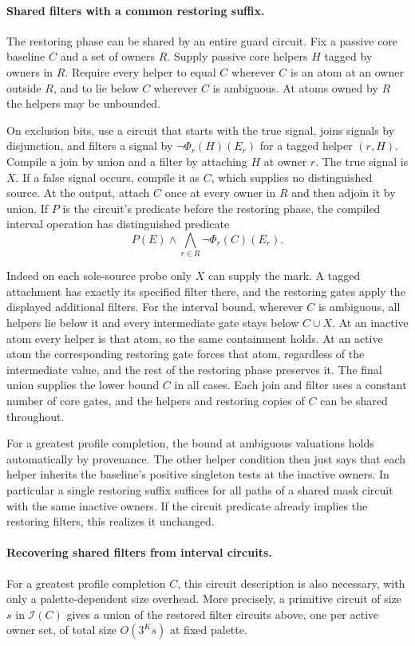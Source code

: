 \paragraph{Shared filters with a common restoring suffix.}
The restoring phase can be shared by an entire
guard circuit. Fix a passive core baseline $C$
and a set of owners $R$. Supply passive core
helpers $H$ tagged by owners in $R$. Require
every helper to equal $C$ wherever $C$ is an
atom at an owner outside $R$, and to lie below
$C$ wherever $C$ is ambiguous. At atoms owned
by $R$ the helpers may be unbounded.

On exclusion bits, use a circuit that starts
with the true signal, joins signals by
disjunction, and filters a signal by
$\neg\Phi_r(H)(E_r)$ for a tagged helper
$(r,H)$. Compile a join by union and a filter
by attaching $H$ at owner $r$. The true signal
is $X$. If a false signal occurs, compile it
as $C$, which supplies no distinguished source.
At the output, attach $C$ once at every owner
in $R$ and then adjoin it by union. If $P$ is
the circuit's predicate before the restoring
phase, the compiled interval operation has
distinguished predicate
\[
             P(E)\land\bigwedge_{r\in R}\neg\Phi_r(C)(E_r).
\]

Indeed on each sole-source probe only $X$
can supply the mark. A tagged attachment has
exactly its specified filter there, and the
restoring gates apply the displayed additional
filters. For the interval bound, wherever $C$
is ambiguous, all helpers lie below it and
every intermediate gate stays below $C\cup X$.
At an inactive atom every helper is that atom,
so the same containment holds. At an active
atom the corresponding restoring gate forces
that atom, regardless of the intermediate
value, and the rest of the restoring phase
preserves it. The final union supplies the
lower bound $C$ in all cases. Each join and
filter uses a constant number of core gates,
and the helpers and restoring copies of $C$
can be shared throughout.

For a greatest profile completion, the bound
at ambiguous valuations holds automatically
by provenance. The other helper condition
then just says that each helper inherits the
baseline's positive singleton tests at the
inactive owners. In particular a single
restoring suffix suffices for all paths of a
shared mask circuit with the same inactive
owners. If the circuit predicate already
implies the restoring filters, this realizes
it unchanged.

\paragraph{Recovering shared filters from interval circuits.}
For a greatest profile completion $C$, this circuit
description is also necessary, with only a
palette-dependent size overhead. More precisely,
a primitive circuit of size $s$ in $\mathcal I(C)$
gives a union of the restored filter circuits
above, one per active owner set, of total size
$O(3^K s)$ at fixed palette.

